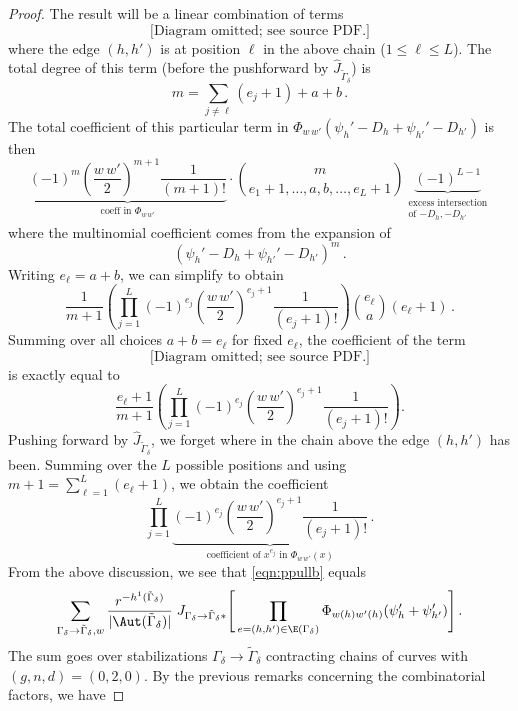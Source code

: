 \begin{proof}
The result will be a linear combination of terms
\begin{equation}
\text{[Diagram omitted; see source PDF.]}
\end{equation}
where the edge $(h,h')$ is at position $\ell$ in the above chain ($1 \leq \ell \leq L$). The total degree of this term (before the pushforward by $\widehat J_{\tilde \Gamma_\delta}$) is
\[m = \sum_{j \neq \ell} (e_j+1) + a + b\, .\]
The total coefficient of this particular term in $\Phi_{w\,w'}(\psi_h' - D_h + \psi_{h'}'- D_{h'})$ is then
\[
\underbrace{(-1)^m (\frac{w\,w'}{2})^{m+1} \frac{1}{(m+1)!}}_{\text{coeff in $\Phi_{w\,w'}$}}\cdot \binom{m}{e_1+1, \ldots, a,b,\ldots, e_L+1} \underbrace{(-1)^{L-1}}_{\substack{\text{excess intersection}\\\text{of $-D_h, -D_{h'}$}}} %
\]
where the multinomial coefficient comes from the expansion of $$(\psi_h' - D_h + \psi_{h'}'- D_{h'})^m\, .$$
Writing $e_\ell=a+b$, we can simplify to obtain
\[
\frac{1}{m+1}
\left(\prod_{j=1}^L (-1)^{e_j} (\frac{w\,w'}{2})^{e_j+1} \frac{1}{(e_j+1)!} \right) \binom{e_\ell}{a} (e_\ell+1)\, .
\]
Summing over all choices $a+b=e_\ell$ for fixed $e_\ell$, the coefficient of the term
\begin{equation}
\text{[Diagram omitted; see source PDF.]}
\end{equation}
is exactly equal to
\[
\frac{e_\ell +1}{m+1}
\left(\prod_{j=1}^L (-1)^{e_j} (\frac{w\,w'}{2})^{e_j+1} \frac{1}{(e_j+1)!} \right).
\]
Pushing forward by $\widehat J_{\tilde \Gamma_\delta}$, we forget where in the chain above the edge $(h,h')$ has been. Summing over the $L$ possible positions and using $m+1 = \sum_{\ell=1}^L (e_\ell +1)$, we obtain the coefficient
\[\prod_{j=1}^L \underbrace{(-1)^{e_j} (\frac{w\,w'}{2})^{e_j+1} \frac{1}{(e_j+1)!}}_{\text{coefficient of $x^{e_j}$ in $\Phi_{w\,w'}(x)$}}\, .\]
From the above discussion, we see that \eqref{eqn:ppullb} equals
\[\sum_{\Gamma_\delta \to \tilde \Gamma_\delta, w}
\frac{r^{-h^1( \tilde \Gamma_\delta)}}{|\Aut(\tilde \Gamma_\delta)| }
\;
J_{\Gamma_\delta \to \tilde \Gamma_\delta*}\Bigg[
\prod_{e=(h,h')\in \E(\Gamma_\delta)}
\Phi_{w(h)w'(h)}(\psi'_h + \psi'_{h'}) \Bigg]\, .\]
The sum goes over stabilizations $\Gamma_\delta \to \tilde \Gamma_\delta$ contracting chains of curves with $(g,n,d)=(0,2,0)$.
By the previous remarks concerning the combinatorial factors, we have

\end{proof}
